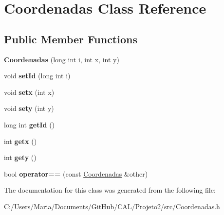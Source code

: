 \hypertarget{class_coordenadas}{}\section{Coordenadas Class Reference}
\label{class_coordenadas}
\subsection*{Public Member Functions}
\begin{DoxyCompactItemize}
\item 
\hypertarget{class_coordenadas_a46b67d7f01481627bd4eb8f14b099e6d}{}\label{class_coordenadas_a46b67d7f01481627bd4eb8f14b099e6d} 
{\bfseries Coordenadas} (long int i, int x, int y)
\item 
\hypertarget{class_coordenadas_aa78d8ae416a5623fe3ae9a38650ac3b3}{}\label{class_coordenadas_aa78d8ae416a5623fe3ae9a38650ac3b3} 
void {\bfseries set\+Id} (long int i)
\item 
\hypertarget{class_coordenadas_ac200d3ab224a8c1f611401b0c3488db1}{}\label{class_coordenadas_ac200d3ab224a8c1f611401b0c3488db1} 
void {\bfseries setx} (int x)
\item 
\hypertarget{class_coordenadas_a1281734232f9d81721056fb39e5442db}{}\label{class_coordenadas_a1281734232f9d81721056fb39e5442db} 
void {\bfseries sety} (int y)
\item 
\hypertarget{class_coordenadas_ae43e121aac86110fab683c33dd4f6604}{}\label{class_coordenadas_ae43e121aac86110fab683c33dd4f6604} 
long int {\bfseries get\+Id} ()
\item 
\hypertarget{class_coordenadas_ae6ea0dca6046a497d671d9178ab520e1}{}\label{class_coordenadas_ae6ea0dca6046a497d671d9178ab520e1} 
int {\bfseries getx} ()
\item 
\hypertarget{class_coordenadas_ab29035946a67a11fc7de773c3a4ee6e9}{}\label{class_coordenadas_ab29035946a67a11fc7de773c3a4ee6e9} 
int {\bfseries gety} ()
\item 
\hypertarget{class_coordenadas_a339a889919a6dfde1136093f51c34175}{}\label{class_coordenadas_a339a889919a6dfde1136093f51c34175} 
bool {\bfseries operator==} (const \hyperlink{class_coordenadas}{Coordenadas} \&other)
\end{DoxyCompactItemize}


The documentation for this class was generated from the following file\+:\begin{DoxyCompactItemize}
\item 
C\+:/\+Users/\+Maria/\+Documents/\+Git\+Hub/\+C\+A\+L/\+Projeto2/src/Coordenadas.\+h\end{DoxyCompactItemize}
